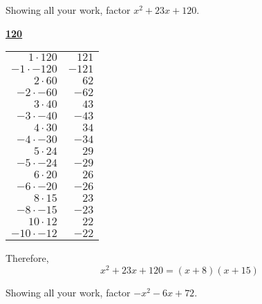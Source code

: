 \documentclass[11pt,letterpaper]{article}
\begin{document}

 Showing all your work, factor $x^2 + 23x + 120$. \pspace

\sol 
	\begin{table}[!ht]
	\centering
	\underline{\bfseries 120} \pvspace{0.2cm}
	\begin{tabular}{rr}
	$1 \cdot 120$ & $121$ \\
	$-1 \cdot -120$ & $-121$ \\
	$2 \cdot 60$ & $62$ \\
	$-2 \cdot -60$ & $-62$ \\
	$3 \cdot 40$ & $43$ \\
	$-3 \cdot -40$ & $-43$ \\
	$4 \cdot 30$ & $34$ \\
	$-4 \cdot -30$ & $-34$ \\
	$5 \cdot 24$ & $29$ \\
	$-5 \cdot -24$ & $-29$ \\
	$6 \cdot 20$ & $26$ \\
	$-6 \cdot -20$ & $-26$ \\ \hline
	\multicolumn{1}{|r}{$8 \cdot 15$} & \multicolumn{1}{r|}{$23$} \\ \hline
	$-8 \cdot -15$ & $-23$ \\
	$10 \cdot 12$ & $22$ \\
	$-10 \cdot -12$ & $-22$ \\
	\end{tabular}
	\end{table}

Therefore,
	\[
	x^2 + 23x + 120= (x + 8)(x + 15)
	\]



\newpage



 Showing all your work, factor $-x^2 - 6x + 72$. \pspace
\end{document}
